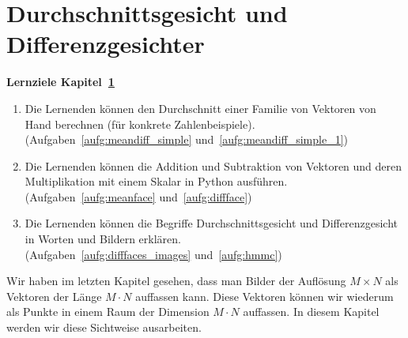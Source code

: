 \section{Durchschnittsgesicht und Differenzgesichter} \label{sec:facespace}
\begin{tcolorbox}
	\centerline{\textbf{Lernziele Kapitel~\ref{sec:facespace}}}
	\begin{enumerate}[leftmargin=*,label=\thesection.\arabic*]
		\item \label{item:meandiff_simple} Die Lernenden können den Durchschnitt einer Familie von Vektoren von Hand berechnen (für konkrete Zahlenbeispiele).\\
		(Aufgaben~\ref{aufg:meandiff_simple} und~\ref{aufg:meandiff_simple_1})
		\item \label{item:meanface} Die Lernenden können die Addition und Subtraktion von Vektoren und deren Multiplikation mit einem Skalar in Python ausführen.\\
		(Aufgaben~\ref{aufg:meanface} und~\ref{aufg:diffface})
		\item \label{item:hmmc} Die Lernenden können die Begriffe Durchschnittsgesicht und Differenzgesicht in Worten und Bildern erklären.\\
		(Aufgaben~\ref{aufg:difffaces_images} und~\ref{aufg:hmmc})
	\end{enumerate}
\end{tcolorbox}
Wir haben im letzten Kapitel gesehen, dass man Bilder der Auflösung $M\times N$ als Vektoren der Länge $M\cdot N$ auffassen kann.
Diese Vektoren können wir wiederum als Punkte in einem Raum der Dimension $M\cdot N$ auffassen.
In diesem Kapitel werden wir diese Sichtweise ausarbeiten.

